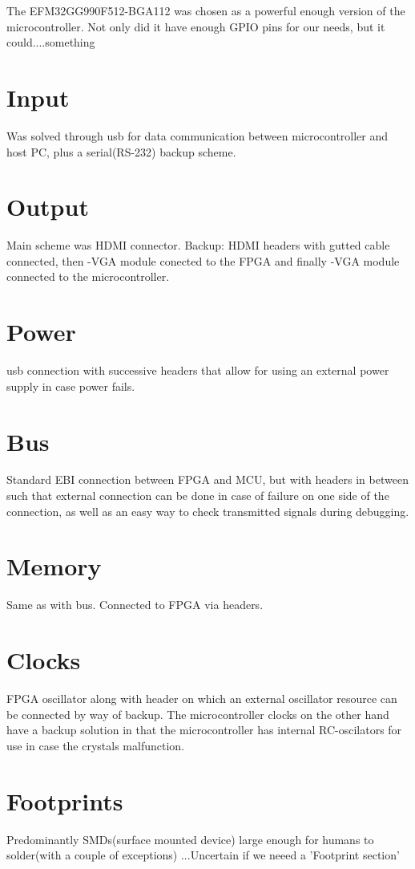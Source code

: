 The EFM32GG990F512-BGA112 was chosen as a powerful enough version of the microcontroller.
Not only did it have enough GPIO pins for our needs, but it could....something %

\section{Input}
Was solved through usb for data communication between microcontroller and host PC, plus a serial(RS-232) backup scheme.

\section{Output}
Main scheme was HDMI connector. Backup: HDMI headers with gutted cable connected, then \mu -VGA module conected to the FPGA and finally \mu -VGA module connected to the microcontroller.

\section{Power}
usb connection with successive headers that allow for using an external power supply in case power fails.

\section{Bus}
Standard EBI connection between FPGA and MCU, but with headers in between such that external connection can be done in case of failure on one side of the connection, as well as an easy way to check transmitted signals during debugging.

\section{Memory}
Same as with bus. Connected to FPGA via headers.
\section{Clocks}
FPGA oscillator along with header on which an external oscillator resource can be connected by way of backup.
The microcontroller clocks on the other hand have a backup solution in that the microcontroller has internal RC-oscilators for use in case the crystals malfunction.

\section{Footprints}
Predominantly SMDs(surface mounted device) large enough for humans to solder(with a couple of exceptions)
...Uncertain if we neeed a 'Footprint section'
